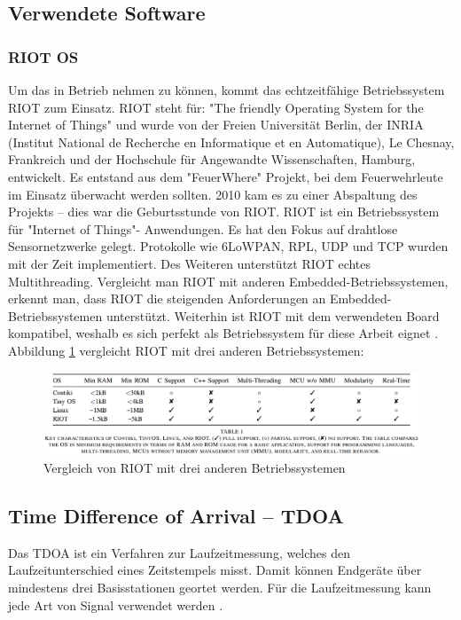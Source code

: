 \subsection{Verwendete Software}
\subsubsection{RIOT OS}
Um das \board \platz in Betrieb nehmen zu können, kommt das echtzeitfähige Betriebssystem RIOT zum Einsatz. RIOT steht für: "The friendly Operating System for the Internet of Things" und wurde von der Freien Universität Berlin, der INRIA (Institut National de Recherche en Informatique et en Automatique), Le Chesnay, Frankreich und der Hochschule für Angewandte Wissenschaften, Hamburg, entwickelt. Es entstand aus dem "FeuerWhere" Projekt, bei dem Feuerwehrleute im Einsatz überwacht werden sollten. 2010 kam es zu einer Abspaltung des Projekts -- dies war die Geburtsstunde von RIOT. RIOT ist ein Betriebssystem für "Internet of Things"- Anwendungen. Es hat den Fokus auf drahtlose Sensornetzwerke gelegt. Protokolle wie 6LoWPAN, RPL, UDP und TCP wurden mit der Zeit implementiert. Des Weiteren unterstützt RIOT echtes Multithreading. Vergleicht man RIOT mit anderen Embedded-Betriebssystemen, erkennt man, dass RIOT die steigenden Anforderungen an Embedded-Betriebssystemen unterstützt. Weiterhin ist RIOT mit dem verwendeten Board \board \platz kompatibel, weshalb es sich perfekt als Betriebssystem für diese Arbeit eignet \cite{src_RIOT}. Abbildung \ref{img:vergleich} vergleicht RIOT mit drei anderen Betriebssystemen:

\begin{figure}[H]
        \centering
		\hspace*{-1.5cm}
        \includegraphics[width=1.2\textwidth]{images/vergleich.png}
        \caption{Vergleich von RIOT mit drei anderen Betriebssystemen}
        \label{img:vergleich}
\end{figure}

\subsection{Time Difference of Arrival -- TDOA}
Das TDOA ist ein Verfahren zur Laufzeitmessung, welches den Laufzeitunterschied eines Zeitstempels misst. Damit können Endgeräte über mindestens drei Basisstationen geortet werden. Für die Laufzeitmessung kann jede Art von Signal verwendet werden \cite{src_TDOA}.

